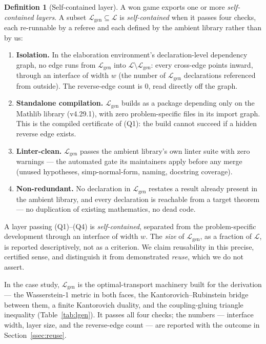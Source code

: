 \documentclass[11pt]{article}
\theoremstyle{plain}
\theoremstyle{definition}
\newtheorem{definition}[theorem]{Definition}
\theoremstyle{remark}
\begin{document}
\begin{definition}[Self-contained layer]\label{def:selfcontained}
A won game exports one or more \emph{self-contained layers}. A subset
$\mathcal{L}_{\mathrm{gen}} \subseteq \mathcal{L}$ is \emph{self-contained} when
it passes four checks, each re-runnable by a referee and each defined by the
ambient library rather than by us:
\begin{enumerate}[label=(Q\arabic*),leftmargin=3em]
\item \textbf{Isolation.} In the elaboration environment's declaration-level
dependency graph, no edge runs from $\mathcal{L}_{\mathrm{gen}}$ into
$\mathcal{L} \setminus \mathcal{L}_{\mathrm{gen}}$: every cross-edge points
inward, through an interface of width $w$ (the number of
$\mathcal{L}_{\mathrm{gen}}$ declarations referenced from outside). The
reverse-edge count is $0$, read directly off the graph.
\item \textbf{Standalone compilation.} $\mathcal{L}_{\mathrm{gen}}$ builds as a
package depending only on the Mathlib library (v4.29.1), with zero
problem-specific files in its import graph. This is the compiled certificate of
(Q1): the build cannot succeed if a hidden reverse edge exists.
\item \textbf{Linter-clean.} $\mathcal{L}_{\mathrm{gen}}$ passes the ambient
library's own linter suite with zero warnings --- the automated gate its
maintainers apply before any merge (unused hypotheses, simp-normal-form, naming,
docstring coverage).
\item \textbf{Non-redundant.} No declaration in $\mathcal{L}_{\mathrm{gen}}$
restates a result already present in the ambient library, and every declaration
is reachable from a target theorem --- no duplication of existing mathematics, no
dead code.
\end{enumerate}
A layer passing (Q1)--(Q4) is \emph{self-contained}, separated from the
problem-specific development through an interface of width $w$. The \emph{size}
of $\mathcal{L}_{\mathrm{gen}}$, as a fraction of $\mathcal{L}$, is reported
descriptively, not as a criterion. We claim reusability in this precise, certified
sense, and distinguish it from demonstrated \emph{reuse}, which we do not assert.
\end{definition}

In the case
study, $\mathcal{L}_{\mathrm{gen}}$ is the optimal-transport machinery built for the
derivation --- the Wasserstein-1 metric in both faces, the
Kantorovich--Rubinstein bridge between them, a finite Kantorovich duality, and the
coupling-gluing triangle inequality (Table~\ref{tab:lgen}). It passes all four checks;
the numbers --- interface width, layer size, and the reverse-edge count --- are reported
with the outcome in Section~\ref{ssec:reuse}.
\end{document}
